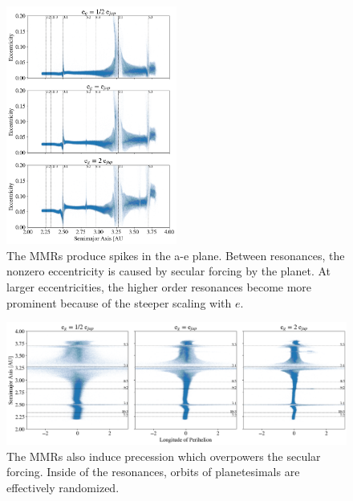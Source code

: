 \documentclass[onecolumn]{aastex63}
\begin{document}
\begin{figure}
\begin{center}
    \includegraphics[width=0.5\textwidth]{figures/ae.png}
    \caption{The MMRs produce spikes in the a-e plane. Between resonances, the nonzero eccentricity is caused by secular
    forcing by the planet. At larger eccentricities, the higher order resonances become more prominent because of the steeper
    scaling with $e$.\label{fig:ae}}
\end{center}
\end{figure}

\begin{figure}
\begin{center}
    \includegraphics[width=\textwidth]{figures/long_ph.png}
    \caption{The MMRs also induce precession which overpowers the secular forcing. Inside of the resonances, orbits of
    planetesimals are effectively randomized.\label{fig:long_ph}}
\end{center}
\end{figure}
\end{document}
